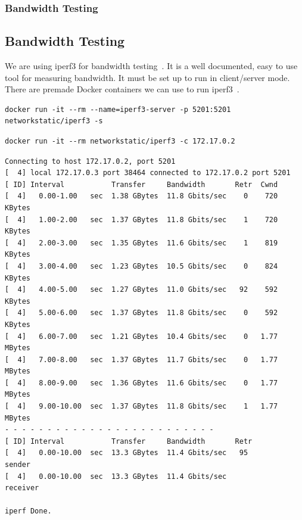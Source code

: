\documentclass[pdf]{beamer}
\begin{document}
\begin{frame}
	\frametitle{Bandwidth Testing}
	\subsection{Bandwidth Testing}
	We are using iperf3 for bandwidth testing~\cite{iperf}.
	It is a well documented, easy to use tool for measuring bandwidth.
	It must be set up to run in client/server mode.
	There are premade Docker containers we can use to run 
	iperf3~\cite{iperfdocker}.

	\begin{lstlisting}[caption = Running an iperf3 Docker container in server mode]
docker run -it --rm --name=iperf3-server -p 5201:5201 networkstatic/iperf3 -s
	\end{lstlisting}

	\begin{lstlisting}[caption = Running an iperf3 Docker container in client mode]
docker run -it --rm networkstatic/iperf3 -c 172.17.0.2
	\end{lstlisting}

	\begin{lstlisting}[caption = iperf3 output, basicstyle=\small]
Connecting to host 172.17.0.2, port 5201
[  4] local 172.17.0.3 port 38464 connected to 172.17.0.2 port 5201
[ ID] Interval           Transfer     Bandwidth       Retr  Cwnd
[  4]   0.00-1.00   sec  1.38 GBytes  11.8 Gbits/sec    0    720 KBytes       
[  4]   1.00-2.00   sec  1.37 GBytes  11.8 Gbits/sec    1    720 KBytes       
[  4]   2.00-3.00   sec  1.35 GBytes  11.6 Gbits/sec    1    819 KBytes       
[  4]   3.00-4.00   sec  1.23 GBytes  10.5 Gbits/sec    0    824 KBytes       
[  4]   4.00-5.00   sec  1.27 GBytes  11.0 Gbits/sec   92    592 KBytes       
[  4]   5.00-6.00   sec  1.37 GBytes  11.8 Gbits/sec    0    592 KBytes       
[  4]   6.00-7.00   sec  1.21 GBytes  10.4 Gbits/sec    0   1.77 MBytes       
[  4]   7.00-8.00   sec  1.37 GBytes  11.7 Gbits/sec    0   1.77 MBytes       
[  4]   8.00-9.00   sec  1.36 GBytes  11.6 Gbits/sec    0   1.77 MBytes       
[  4]   9.00-10.00  sec  1.37 GBytes  11.8 Gbits/sec    1   1.77 MBytes       
- - - - - - - - - - - - - - - - - - - - - - - - -
[ ID] Interval           Transfer     Bandwidth       Retr
[  4]   0.00-10.00  sec  13.3 GBytes  11.4 Gbits/sec   95             sender
[  4]   0.00-10.00  sec  13.3 GBytes  11.4 Gbits/sec                  receiver

iperf Done.
	\end{lstlisting}

\end{frame}
\end{document}
